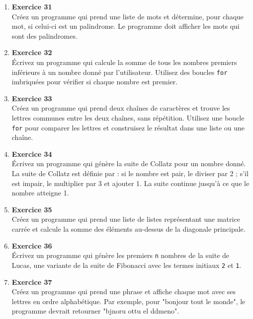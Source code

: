 \documentclass{article}
\begin{document}
\begin{enumerate}

    \item \textbf{Exercice 31} \\
    Créez un programme qui prend une liste de mots et détermine, pour chaque mot, si celui-ci est un palindrome. Le programme doit afficher les mots qui sont des palindromes.

    \item \textbf{Exercice 32} \\
    Écrivez un programme qui calcule la somme de tous les nombres premiers inférieurs à un nombre donné par l'utilisateur. Utilisez des boucles \texttt{for} imbriquées pour vérifier si chaque nombre est premier.

    \item \textbf{Exercice 33} \\
    Créez un programme qui prend deux chaînes de caractères et trouve les lettres communes entre les deux chaînes, sans répétition. Utilisez une boucle \texttt{for} pour comparer les lettres et construisez le résultat dans une liste ou une chaîne.

    \item \textbf{Exercice 34} \\
    Écrivez un programme qui génère la suite de Collatz pour un nombre donné. La suite de Collatz est définie par : si le nombre est pair, le diviser par 2 ; s'il est impair, le multiplier par 3 et ajouter 1. La suite continue jusqu'à ce que le nombre atteigne 1.

    \item \textbf{Exercice 35} \\
    Créez un programme qui prend une liste de listes représentant une matrice carrée et calcule la somme des éléments au-dessus de la diagonale principale.

    \item \textbf{Exercice 36} \\
    Écrivez un programme qui génère les premiers \texttt{n} nombres de la suite de Lucas, une variante de la suite de Fibonacci avec les termes initiaux \texttt{2} et \texttt{1}.

    \item \textbf{Exercice 37} \\
    Créez un programme qui prend une phrase et affiche chaque mot avec ses lettres en ordre alphabétique. Par exemple, pour "bonjour tout le monde", le programme devrait retourner "bjnoru ottu el ddmeno".


\end{enumerate}
\end{document}

